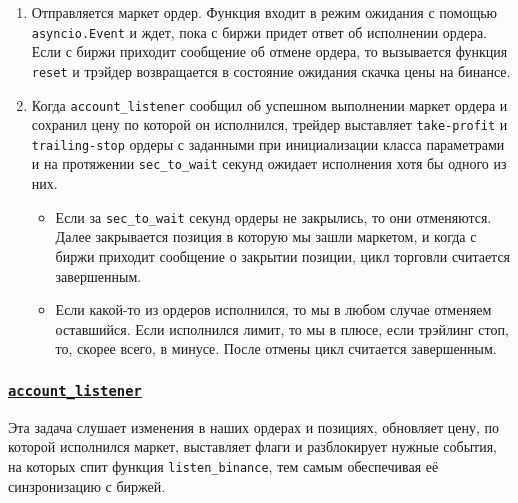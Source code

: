 \begin{enumerate}
    \item Отправляется маркет ордер. Функция входит в режим ожидания с помощью \texttt{asyncio.Event} и ждет, пока с биржи придет ответ об исполнении ордера. Если с биржи приходит сообщение об отмене ордера, то вызывается функция \texttt{reset} и трэйдер возвращается в состояние ожидания скачка цены на бинансе.
    \item Когда \texttt{account\_listener} сообщил об успешном выполнении маркет ордера и сохранил цену по которой он исполнился, трейдер выставляет \texttt{take-profit} и \texttt{trailing-stop} ордеры с заданными при инициализации класса параметрами и на протяжении \texttt{sec\_to\_wait} секунд ожидает исполнения хотя бы одного из них.
    \begin{itemize}
        \item Если за \texttt{sec\_to\_wait} секунд ордеры не закрылись, то они отменяются. Далее закрывается позиция в которую мы зашли маркетом, и когда с биржи приходит сообщение о закрытии позиции, цикл торговли считается завершенным.
        \item Если какой-то из ордеров исполнился, то мы в любом случае отменяем оставшийся. Если исполнился лимит, то мы в плюсе, если трэйлинг стоп, то, скорее всего, в минусе. После отмены цикл считается завершенным.
    \end{itemize}
    
\end{enumerate}


\subsubsection{\href{https://github.com/dexety/dex-trading-system/blob/main/research/ib-0002-cross-analysis/trader.py#L365}{\texttt{account\_listener}}}

Эта задача слушает изменения в наших ордерах и позициях, обновляет цену, по которой исполнился маркет, выставляет флаги и разблокирует нужные события, на которых спит функция \texttt{listen\_binance}, тем самым обеспечивая её синзронизацию с биржей.
